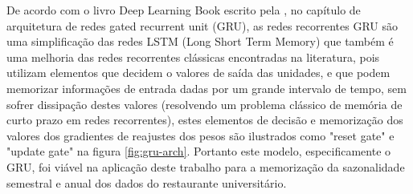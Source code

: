 
De acordo com  o livro Deep Learning Book escrito pela  , no capítulo de arquitetura de redes gated recurrent unit (GRU), as redes recorrentes GRU são uma simplificação das redes LSTM (Long Short Term Memory) que também  é uma melhoria das redes recorrentes clássicas encontradas na literatura, pois utilizam elementos que decidem o valores de saída das unidades, e que podem memorizar informações de entrada dadas por um grande intervalo de tempo, sem sofrer dissipação destes valores (resolvendo um problema clássico de memória de curto prazo em redes recorrentes), estes elementos de decisão e memorização dos valores dos gradientes de reajustes dos pesos são ilustrados como "reset gate" e "update gate" na figura \ref{fig:gru-arch}. Portanto este modelo, especificamente o GRU, foi viável na aplicação deste trabalho para a memorização da sazonalidade semestral e anual dos dados do restaurante universitário.
     	
        \begin{figure}[H]
        \end{figure}